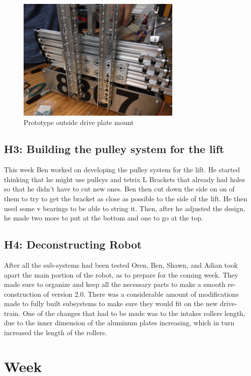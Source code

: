 \documentclass{article}
\begin{document}
\begin{figure}
    \centering
    \includegraphics[height=6cm]{16_12-17/images/mount_proto.JPG}
    \caption{Prototype outside drive plate mount}
    \label{Prototype Mount}
\end{figure}

\subsection{H3: Building the pulley system for the lift}

This week Ben worked on developing the pulley system for the lift. He started thinking that he might use pulleys and tetrix L Brackets that already had holes so that he didn't have to cut new ones. Ben then cut down the side on on of them to try to get the bracket as close as possible to the side of the lift. He then used some v bearings to be able to string it. Then, after he adjusted the design, he made two more to put at the bottom and one to go at the top.

\subsection{H4: Deconstructing Robot}

After all the sub-systems had been tested Oren, Ben, Shawn, and Adian took apart the main portion of the robot, as to prepare for the coming week. They made sure to organize and keep all the necessary parts to make a smooth re-construction of version 2.0. There was a considerable amount of modifications made to fully built subsystems to make sure they would fit on the new drive-train. One of the changes that had to be made was to the intakes rollers length, due to the inner dimension of the aluminum plates increasing, which in turn increased the length of the rollers. 
\clearpage \newpage \section{Week \thesection} 
\end{document}
